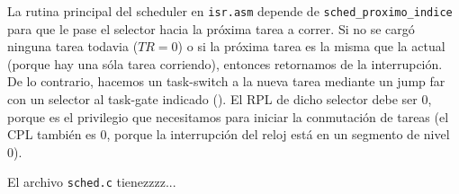 \documentclass{article}
\begin{document}
	La rutina principal del scheduler en \texttt{isr.asm} depende de \texttt{sched\_proximo\_indice} para que le pase el selector hacia la próxima tarea a correr. Si no se cargó ninguna tarea todavia ($TR = 0$) o si la próxima tarea es la misma que la actual (porque hay una sóla tarea corriendo), entonces retornamos de la interrupción. De lo contrario, hacemos un task-switch a la nueva tarea mediante un jump far con un selector al task-gate indicado (). El RPL de dicho selector debe ser 0, porque es el privilegio que necesitamos para iniciar la conmutación de tareas (el CPL también es 0, porque la interrupción del reloj está en un segmento de nivel 0).
		
	El archivo \texttt{sched.c} tienezzzz...
			
	
\end{document}
